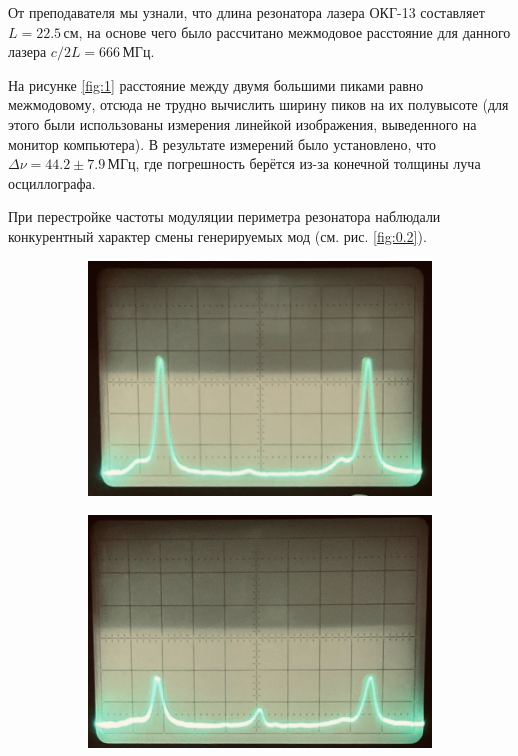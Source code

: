 \documentclass[12pt, russian, a4paper]{article}
\begin{document}
	От преподавателя мы узнали, что длина резонатора лазера ОКГ-13 составляет $L = 22.5\,\text{см}$, на основе чего было рассчитано межмодовое расстояние для данного лазера $c/2L = 666\,\text{МГц}$.

	На рисунке \ref{fig:1} расстояние между двумя большими пиками равно межмодовому, отсюда не трудно вычислить ширину пиков на их полувысоте (для этого были использованы измерения линейкой изображения, выведенного на монитор компьютера). В результате измерений было установлено, что $\Delta \nu = 44.2 \pm 7.9\,\text{МГц}$, где погрешность берётся из-за конечной толщины луча осциллографа.

	При перестройке частоты модуляции периметра резонатора наблюдали конкурентный характер смены генерируемых мод (см. рис. \ref{fig:0.2}).

	\begin{figure} 
    	\centering
    	\begin{subfigure}[tb]{.32\textwidth}
			\centering
		 	\includegraphics[width=\textwidth]{../images/1.PNG}
			\caption{}
			\label{fig:0.2-1}
		\end{subfigure}
    	\hfill
    	\begin{subfigure}[tb]{.32\textwidth}
			\centering
			\includegraphics[width=\textwidth]{../images/2.PNG}

\end{subfigure}
\end{figure}
\end{document}
